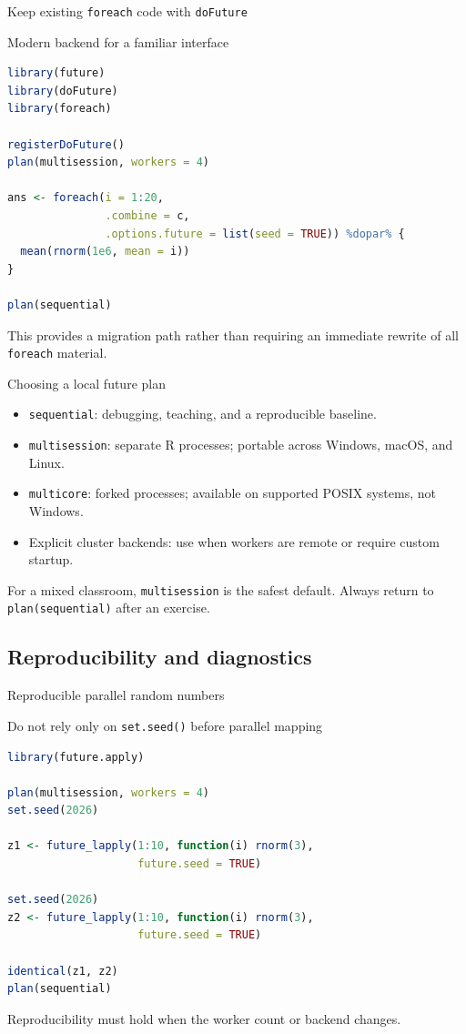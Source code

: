 \begin{frame}[fragile]{Keep existing \texttt{foreach} code with \texttt{doFuture}}
\begin{block}{Modern backend for a familiar interface}
\begin{lstlisting}[language=R]
library(future)
library(doFuture)
library(foreach)

registerDoFuture()
plan(multisession, workers = 4)

ans <- foreach(i = 1:20,
               .combine = c,
               .options.future = list(seed = TRUE)) %dopar% {
  mean(rnorm(1e6, mean = i))
}

plan(sequential)
\end{lstlisting}
\end{block}
This provides a migration path rather than requiring an immediate rewrite of all \texttt{foreach} material.
\end{frame}

\begin{frame}{Choosing a local future plan}
\begin{itemize}
  \item \texttt{sequential}: debugging, teaching, and a reproducible baseline.
  \item \texttt{multisession}: separate R processes; portable across Windows, macOS, and Linux.
  \item \texttt{multicore}: forked processes; available on supported POSIX systems, not Windows.
  \item Explicit cluster backends: use when workers are remote or require custom startup.
\end{itemize}
\vspace{0.2cm}
For a mixed classroom, \texttt{multisession} is the safest default. Always return to \texttt{plan(sequential)} after an exercise.
\end{frame}

\subsection{Reproducibility and diagnostics}

\begin{frame}[fragile]{Reproducible parallel random numbers}
\begin{block}{Do not rely only on \texttt{set.seed()} before parallel mapping}
\begin{lstlisting}[language=R]
library(future.apply)

plan(multisession, workers = 4)
set.seed(2026)

z1 <- future_lapply(1:10, function(i) rnorm(3),
                    future.seed = TRUE)

set.seed(2026)
z2 <- future_lapply(1:10, function(i) rnorm(3),
                    future.seed = TRUE)

identical(z1, z2)
plan(sequential)
\end{lstlisting}
\end{block}
Reproducibility must hold when the worker count or backend changes.
\end{frame}

